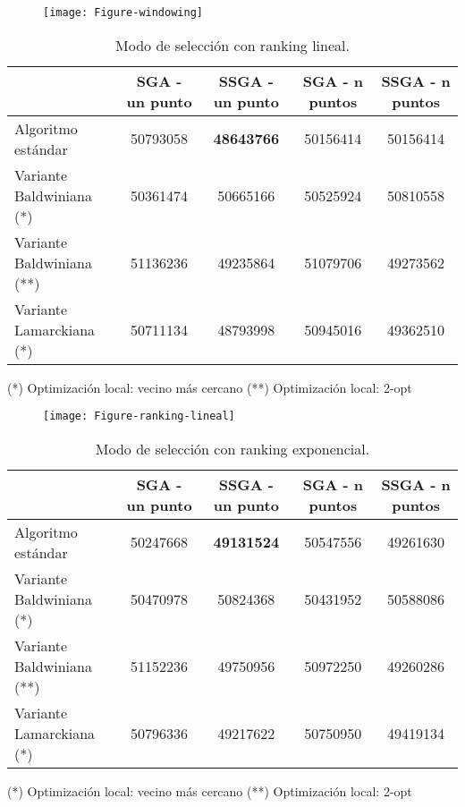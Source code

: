 \documentclass[10pt]{article}
\begin{document}
\begin{figure}[H]
	\begin{center}
 		\texttt{[image: Figure-windowing]}
	\end{center} 
\end{figure}


\begin{table}[htb]
\centering
\begin{tabular}{| l | c | c | c | c |}
\hline
& SGA - un punto & SSGA - un punto & SGA - n puntos & SSGA - n puntos \\
\hline
Algoritmo estándar  & 50793058 & \textbf{48643766}  & 50156414  & 50156414\\ \cline{1-5}
Variante Baldwiniana (*) & 50361474 & 50665166  & 50525924 & 50810558\\ \cline{1-5}
Variante Baldwiniana (**) & 51136236 & 49235864  & 51079706 & 49273562\\ \cline{1-5}
Variante Lamarckiana (*) & 50711134 & 48793998 & 50945016 & 49362510\\ 
\hline
\end{tabular}
{    (*) Optimización local: vecino más cercano} 
{    (**) Optimización local: 2-opt} 
\caption{Modo de selección con ranking lineal.}
\end{table}

\begin{figure}[H]
	\begin{center}
 		\texttt{[image: Figure-ranking-lineal]}
	\end{center} 
\end{figure}


\begin{table}[htb]
\centering
\begin{tabular}{| l | c | c | c | c |}
\hline
& SGA - un punto & SSGA - un punto & SGA - n puntos & SSGA - n puntos \\
\hline
Algoritmo estándar  & 50247668 & \textbf{49131524}  & 50547556  & 49261630\\ \cline{1-5}
Variante Baldwiniana (*) & 50470978 & 50824368  & 50431952 & 50588086\\ \cline{1-5}
Variante Baldwiniana (**) & 51152236 & 49750956  & 50972250 & 49260286\\ \cline{1-5}
Variante Lamarckiana (*) & 50796336 & 49217622 & 50750950 & 49419134\\ 
\hline
\end{tabular}
{    (*) Optimización local: vecino más cercano} 
{    (**) Optimización local: 2-opt} 
\caption{Modo de selección con ranking exponencial.}
\end{table}
\end{document}
